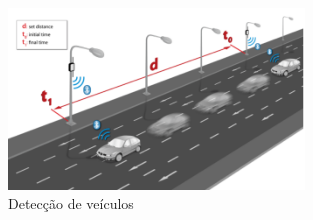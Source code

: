 \begin{figure}[htb]
  \caption{\label{meshlium-carros}Detecção de veículos}
  \begin{center}
    \includegraphics[width=0.70\textwidth]{img/meshlium-carros.png}
  \end{center}
\end{figure}
